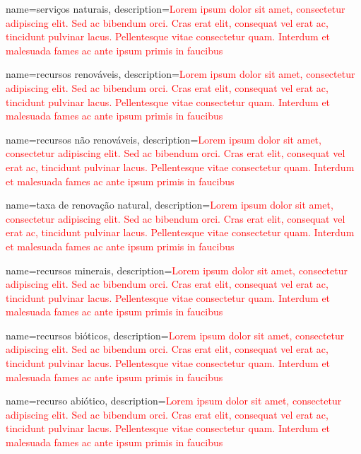 {
	name=serviços naturais,
	description={\textcolor{red}{Lorem ipsum dolor sit amet, consectetur adipiscing elit. Sed ac bibendum orci. Cras erat elit, consequat vel erat ac, tincidunt pulvinar lacus. Pellentesque vitae consectetur quam. Interdum et malesuada fames ac ante ipsum primis in faucibus}}
}

{
	name=recursos renováveis,
	description={\textcolor{red}{Lorem ipsum dolor sit amet, consectetur adipiscing elit. Sed ac bibendum orci. Cras erat elit, consequat vel erat ac, tincidunt pulvinar lacus. Pellentesque vitae consectetur quam. Interdum et malesuada fames ac ante ipsum primis in faucibus}}
}

{
	name=recursos não renováveis,
	description={\textcolor{red}{Lorem ipsum dolor sit amet, consectetur adipiscing elit. Sed ac bibendum orci. Cras erat elit, consequat vel erat ac, tincidunt pulvinar lacus. Pellentesque vitae consectetur quam. Interdum et malesuada fames ac ante ipsum primis in faucibus}}
}

{
	name=taxa de renovação natural,
	description={\textcolor{red}{Lorem ipsum dolor sit amet, consectetur adipiscing elit. Sed ac bibendum orci. Cras erat elit, consequat vel erat ac, tincidunt pulvinar lacus. Pellentesque vitae consectetur quam. Interdum et malesuada fames ac ante ipsum primis in faucibus}}
}

{
	name=recursos minerais,
	description={\textcolor{red}{Lorem ipsum dolor sit amet, consectetur adipiscing elit. Sed ac bibendum orci. Cras erat elit, consequat vel erat ac, tincidunt pulvinar lacus. Pellentesque vitae consectetur quam. Interdum et malesuada fames ac ante ipsum primis in faucibus}}
}

{
	name=recursos bióticos,
	description={\textcolor{red}{Lorem ipsum dolor sit amet, consectetur adipiscing elit. Sed ac bibendum orci. Cras erat elit, consequat vel erat ac, tincidunt pulvinar lacus. Pellentesque vitae consectetur quam. Interdum et malesuada fames ac ante ipsum primis in faucibus}}
}

{
	name=recurso abiótico,
	description={\textcolor{red}{Lorem ipsum dolor sit amet, consectetur adipiscing elit. Sed ac bibendum orci. Cras erat elit, consequat vel erat ac, tincidunt pulvinar lacus. Pellentesque vitae consectetur quam. Interdum et malesuada fames ac ante ipsum primis in faucibus}}
}

